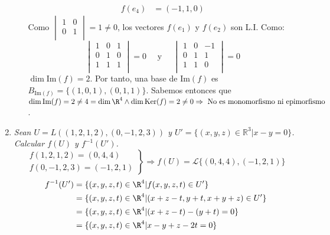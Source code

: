 \begin{ejercicio}
\begin{enumerate}
\begin{itemize}
\begin{align*}
				            f(e_4) & = (-1,1,0)
			            \end{align*}
			            Como $\begin{vmatrix}
					            1 & 0 \\
					            0 & 1 \\
				            \end{vmatrix} = 1 \neq 0$, los vectores $f(e_1)$ y $f(e_2)$ son L.I. Como:
			            \begin{equation*}
				            \begin{vmatrix}
					            1 & 0 & 1 \\
					            0 & 1 & 0 \\
					            1 & 1 & 1 \\
				            \end{vmatrix} = 0 \quad \text{ y } \quad
				            \begin{vmatrix}
					            1 & 0 & -1 \\
					            0 & 1 & 1  \\
					            1 & 1 & 0  \\
				            \end{vmatrix} = 0
			            \end{equation*} $\dim{ \text{Im}(f)} = 2$. Por tanto, una base de Im$(f)$ es $B_{\text{Im}(f)} = \{(1,0,1),(0,1,1)\}$. Sabemos entonces que
			            $\dim{ \text{Im}(f)} = 2 \neq 4 = \dim{\R^4} \land \dim{ \text{Ker}(f)} = 2 \neq 0 \Rightarrow \text{ No es monomorfismo ni epimorfismo}$.
		      \end{itemize}
		\item \textit{Sean \( U = L((1,2,1,2), (0,-1,2,3)) \) y \( U' = \{(x,y,z) \in \mathbb{R}^3 | x - y = 0\} \). Calcular \( f(U) \) y \( f^{-1}(U') \).}
		      \begin{equation*}
			      \left.\begin{array}{rcl}
				      f(1,2,1,2) = (0,4,4) \\
				      f(0,-1,2,3) = (-1,2,1)
			      \end{array} \right\} \Rightarrow f(U) = \mathcal{L}\{(0,4,4),(-1,2,1)\}
		      \end{equation*}
		      \begin{align*}
			      f^{-1}(U') & = \{(x,y,z,t) \in \R^4 | f(x,y,z,t) \in U'\}  \\&= \{(x,y,z,t) \in \R^4 |  (x+z-t, y+t,x+y+z) \in U'\} \\
			                 & = \{(x,y,z,t) \in \R^4 |  (x+z-t)-(y+t) = 0\} \\&= \{(x,y,z,t) \in \R^4 |  x-y+z-2t = 0\}             \\

\end{align*}
\end{enumerate}
\end{ejercicio}

